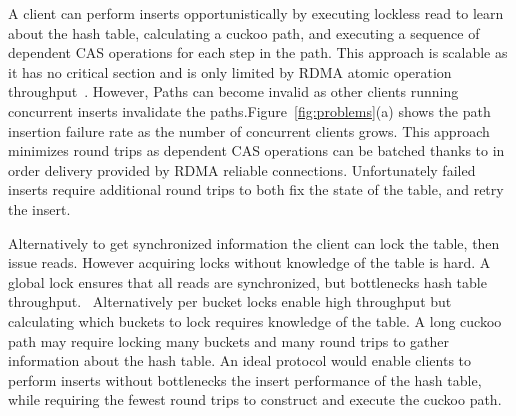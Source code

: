 A client can perform inserts opportunistically by executing
lockless read to learn about the hash table, calculating a
cuckoo path, and executing a sequence of dependent CAS
operations for each step in the path. This approach is
scalable as it has no critical section and is only limited
by RDMA atomic operation
throughput~\cite{design-guidelines}. However, Paths can
become invalid as other clients running concurrent inserts
invalidate the paths.Figure~\ref{fig:problems}(a) shows the path
insertion failure rate as the number of concurrent clients
grows. This approach minimizes round trips as dependent CAS
operations can be batched thanks to in order delivery
provided by RDMA reliable connections. Unfortunately failed
inserts require additional round trips to both fix the state
of the table, and retry the insert.

Alternatively to get synchronized information the client can
lock the table, then issue reads. However acquiring locks
without knowledge of the table is hard. A global lock
ensures that all reads are synchronized, but bottlenecks
hash table throughput.~
Alternatively per bucket locks enable high throughput but
calculating which buckets to lock requires knowledge of the
table. A long cuckoo path may require locking many buckets
and many round trips to gather information about the hash
table.
An ideal protocol would enable clients to perform inserts
without bottlenecks the insert performance of the hash
table, while requiring the fewest round trips to construct
and execute the cuckoo path.


